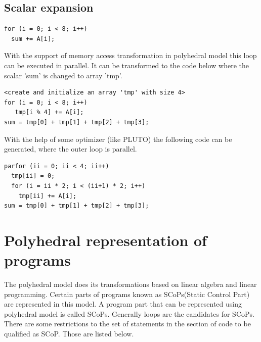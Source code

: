 \subsection{Scalar expansion}
{\footnotesize
\begin{lstlisting}
for (i = 0; i < 8; i++)
  sum += A[i];
\end{lstlisting}
}
With the support of memory access transformation in polyhedral model this loop
can be executed in parallel. It can be transformed to the code below where the scalar 'sum'
is changed to array 'tmp'.  
{\footnotesize
\begin{lstlisting}
<create and initialize an array 'tmp' with size 4>
for (i = 0; i < 8; i++)
   tmp[i % 4] += A[i];
sum = tmp[0] + tmp[1] + tmp[2] + tmp[3];
\end{lstlisting}
}
With the help of some optimizer (like PLUTO\cite{pluto}) the following code
can be generated, where the outer loop is parallel.
{\footnotesize
\begin{lstlisting}
parfor (ii = 0; ii < 4; ii++)
  tmp[ii] = 0;
  for (i = ii * 2; i < (ii+1) * 2; i++)
    tmp[ii] += A[i];
sum = tmp[0] + tmp[1] + tmp[2] + tmp[3];
\end{lstlisting}
}

\section{Polyhedral representation of programs}

The polyhedral model does its transformations based on linear algebra and linear programming.
Certain parts of programs known as SCoPs(Static Control Part) are represented in this model.
A program part that can be represented using polyhedral model is called SCoPs. Generally
loops are the candidates for SCoPs. There are some restrictions to the set of statements 
in the section of code to be qualified as SCoP. Those are listed below.

